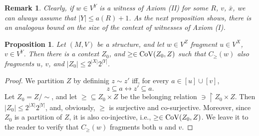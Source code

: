 \documentclass[12pt]{amsart}
\theoremstyle{plain}
\newtheorem{remark}[theorem]{\bf Remark}
\newtheorem{proposition}[theorem]{\bf Proposition}
\newcommand \Val{{\rm{CoV}}}
\newcommand \uhr{\upharpoonright}
\newcommand \PP{\mathcal{P}}
\newcommand \PPb{\mathbb{P}}
\begin{document}
	
	\begin{remark}
		\label{re:BoundOnZII}
		Clearly, if $w \in V^Y$ is a witness of Axiom (II) for some $R$, $v$, $\bar{x}$, we can always assume that $|Y| \leq a(R)+1$. As the next proposition shows, there is an analogous bound on the size of the context of witnesses of Axiom (I).
	\end{remark}
	
	\begin{proposition}
		\label{pr:BoundOnZI}
		Let $(M,V)$ be a structure, and let $w \in V^Z$ fragment $u \in V^X$, $v \in V^Y$. Then there is a context $Z_0$, and $\geq \in \Val(Z_0,Z)$ such that $C_\geq(w)$ also fragments $u$, $v$, and $|Z_0| \leq 2^{|X|}2^{|Y|}$.
	\end{proposition}
	
	\begin{proof}
	We partition $Z$ by defininig $z \sim z'$ iff, for every $a \in [u] \cup [v]$, $$z \subseteq a \leftrightarrow z' \subseteq a.$$
	Let $Z_0=Z/\sim$, and let $\geq  \subseteq Z_0 \times Z$ be the belonging relation $\ni \uhr Z_0 \times Z$. Then $|Z_0| \leq 2^{|X|}2^{|Y|}$, and, obviously, $\geq$ is surjective and co-surjective. Moreover, since $Z_0$ is a partition of $Z$, it is also co-injective, i.e., $\geq \in \Val(Z_0,Z)$. We leave it to the reader to verify that $C_\geq(w)$ fragments both $u$ and $v$.

	
		
		
	\end{proof}
\end{document}
